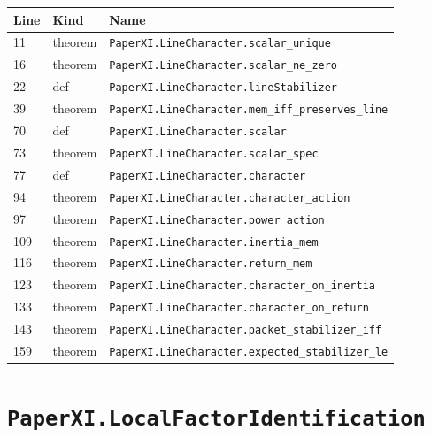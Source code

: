 \documentclass[10pt,oneside]{book}
\begin{document}
\begin{longtable}{@{}p{}p{}p{}@{}}\toprule Line&Kind&Name\\\midrule\endhead

11&theorem&\nolinkurl{PaperXI.LineCharacter.scalar_unique}\\

16&theorem&\nolinkurl{PaperXI.LineCharacter.scalar_ne_zero}\\

22&def&\nolinkurl{PaperXI.LineCharacter.lineStabilizer}\\

39&theorem&\nolinkurl{PaperXI.LineCharacter.mem_iff_preserves_line}\\

70&def&\nolinkurl{PaperXI.LineCharacter.scalar}\\

73&theorem&\nolinkurl{PaperXI.LineCharacter.scalar_spec}\\

77&def&\nolinkurl{PaperXI.LineCharacter.character}\\

94&theorem&\nolinkurl{PaperXI.LineCharacter.character_action}\\

97&theorem&\nolinkurl{PaperXI.LineCharacter.power_action}\\

109&theorem&\nolinkurl{PaperXI.LineCharacter.inertia_mem}\\

116&theorem&\nolinkurl{PaperXI.LineCharacter.return_mem}\\

123&theorem&\nolinkurl{PaperXI.LineCharacter.character_on_inertia}\\

133&theorem&\nolinkurl{PaperXI.LineCharacter.character_on_return}\\

143&theorem&\nolinkurl{PaperXI.LineCharacter.packet_stabilizer_iff}\\

159&theorem&\nolinkurl{PaperXI.LineCharacter.expected_stabilizer_le}\\

\bottomrule\end{longtable}

\section{\texorpdfstring{\nolinkurl{PaperXI.LocalFactorIdentification}}{PaperXI.LocalFactorIdentification}}\label{module:PaperXI.LocalFactorIdentification}
\end{document}
